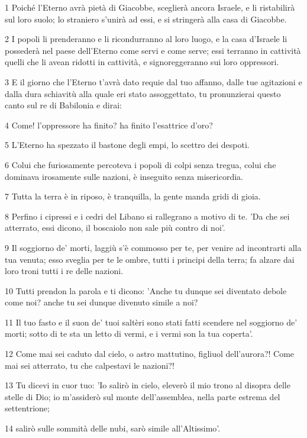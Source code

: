 \par 1 Poiché l'Eterno avrà pietà di Giacobbe, sceglierà ancora Israele, e li ristabilirà sul loro suolo; lo straniero s'unirà ad essi, e si stringerà alla casa di Giacobbe.
\par 2 I popoli li prenderanno e li ricondurranno al loro luogo, e la casa d'Israele li possederà nel paese dell'Eterno come servi e come serve; essi terranno in cattività quelli che li avean ridotti in cattività, e signoreggeranno sui loro oppressori.
\par 3 E il giorno che l'Eterno t'avrà dato requie dal tuo affanno, dalle tue agitazioni e dalla dura schiavitù alla quale eri stato assoggettato, tu pronunzierai questo canto sul re di Babilonia e dirai:
\par 4 Come! l'oppressore ha finito? ha finito l'esattrice d'oro?
\par 5 L'Eterno ha spezzato il bastone degli empi, lo scettro dei despoti.
\par 6 Colui che furiosamente percoteva i popoli di colpi senza tregua, colui che dominava irosamente sulle nazioni, è inseguito senza misericordia.
\par 7 Tutta la terra è in riposo, è tranquilla, la gente manda gridi di gioia.
\par 8 Perfino i cipressi e i cedri del Libano si rallegrano a motivo di te. 'Da che sei atterrato, essi dicono, il boscaiolo non sale più contro di noi'.
\par 9 Il soggiorno de' morti, laggiù s'è commosso per te, per venire ad incontrarti alla tua venuta; esso sveglia per te le ombre, tutti i principi della terra; fa alzare dai loro troni tutti i re delle nazioni.
\par 10 Tutti prendon la parola e ti dicono: 'Anche tu dunque sei diventato debole come noi? anche tu sei dunque divenuto simile a noi?
\par 11 Il tuo fasto e il suon de' tuoi saltèri sono stati fatti scendere nel soggiorno de' morti; sotto di te sta un letto di vermi, e i vermi son la tua coperta'.
\par 12 Come mai sei caduto dal cielo, o astro mattutino, figliuol dell'aurora?! Come mai sei atterrato, tu che calpestavi le nazioni?!
\par 13 Tu dicevi in cuor tuo: 'Io salirò in cielo, eleverò il mio trono al disopra delle stelle di Dio; io m'assiderò sul monte dell'assemblea, nella parte estrema del settentrione;
\par 14 salirò sulle sommità delle nubi, sarò simile all'Altissimo'.
